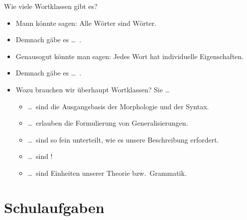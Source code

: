 \begin{frame}
  {Wie viele Wortklassen gibt es?}
  \onslide<+->
  \begin{itemize}[<+->]
    \item Mann könnte sagen: Alle Wörter sind \alert{Wörter}.
    \item Demnach gäbe es \ldots\ \onslide<+->.
      \Zeile
    \item Genausogut könnte man sagen: Jedes Wort hat \alert{individuelle Eigenschaften}.
    \item Demnach gäbe es \ldots\ \onslide<+->.
      \Zeile
    \item Wozu brauchen wir überhaupt Wortklassen? Sie \ldots\\
      \Viertelzeile
      \begin{itemize}[<+->]
        \item \dots\ sind \alert{die Ausgangsbasis der Morphologie und der Syntax}.
        \item \dots\ erlauben die Formulierung von \alert{Generalisierungen}.
        \item \dots\ sind so fein unterteilt, wie es unsere Beschreibung erfordert.
        \item \dots\ sind !
        \item \dots\ sind \alert{Einheiten unserer Theorie bzw.\ Grammatik}.
      \end{itemize}
  \end{itemize}
\end{frame}


\section{Schulaufgaben}

